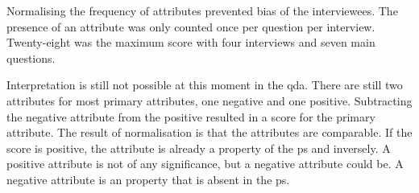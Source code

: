 Normalising the frequency of \glspl{attribute} prevented bias of the interviewees. The presence of an attribute was only counted once per question per interview. Twenty-eight was the maximum score with four interviews and seven main questions.
 
Interpretation is still not possible at this moment in the \acrshort{qda}. There are still two \glspl{attribute} for most primary \glspl{attribute}, one negative and one positive. Subtracting the negative \gls{attribute} from the positive resulted in a score for the primary \gls{attribute}. The result of normalisation is that the \glspl{attribute} are comparable. If the score is positive, the \gls{attribute} is already a property of the \gls{ps} and inversely. A positive \gls{attribute} is not of any significance, but a negative \gls{attribute} could be. A negative attribute is an property that is absent in the \gls{ps}.
 
